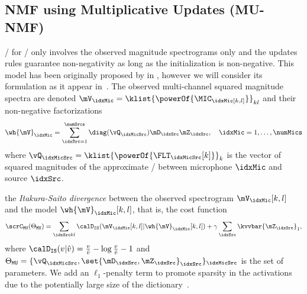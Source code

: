 \subsection{NMF using Multiplicative Updates (MU-NMF)}\label{sec:separake:mu}
\MU/ for \NMF/ only involves the observed magnitude spectrograms only and the updates rules guarantee non-negativity as long as the initialization is non-negative.
This model has been originally proposed by in , however we will consider its formulation as it appear in~.
The observed multi-channel squared magnitude spectra are denoted $\mV_\idxMic = \klist{\powerOf{\MIC_\idxMic[k,l]}}_{kl}$ and their non-negative factorizations
\begin{equation}
    \label{eq:mu_nmf}
    \wh{\mV}_\idxMic = \sum_{\idxSrc=1}^{\numSrcs} \diag(\vQ_{\idxMicSrc}) \mD_\idxSrc \mZ_\idxSrc , \quad \idxMic=1,\ldots,\numMics
\end{equation}
where $\vQ_{\idxMicSrc} = \klist{\powerOf{\FLT_{\idxMicSrc}[k]}}_k$ is the vector of squared magnitudes of the approximate \RTF/ between microphone $\idxMic$ and source $\idxSrc$.

 the \textit{Itakura-Saito divergence}  between the observed spectrogram $\mV_{\idxMic}[k,l]$ and the model $\wh{\mV}_{\idxMic}[k,l]$, that is, the cost function
\begin{equation}
    \scrC_{\mathtt{MU}}(\Theta_{\mathtt{MU}}) = \sum_{\idxSrc k l} \calD_{\mathtt{IS}}(\mV_{\idxMic}[k,l] | \wh{\mV}_{\idxMic}[k,l])
    + \gamma \sum_\idxSrc \kvvbar{\mZ_\idxSrc}_1,
\end{equation}
where $\calD_{\mathtt{IS}}( v | \hat{v} ) = \frac{v}{\hat{v}} - \log \frac{v}{\hat{v}} - 1$ and $\Theta_{\mathtt{MU}} = \{\vQ_{\idxMicSrc}, \set{\mD_\idxSrc, \mZ_\idxSrc}_\idxSrc\}_{\idxMicSrc}$ is the set of parameters.
We add an $\ell_1$-penalty term to promote sparsity in the activations due to the potentially large size of the dictionary~.

